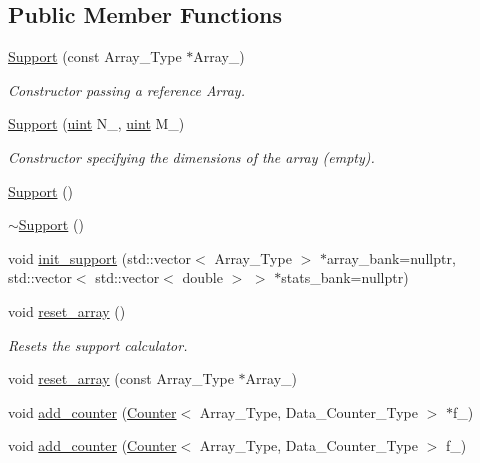\subsection*{Public Member Functions}
\begin{DoxyCompactItemize}
\item 
\hyperlink{class_support_aacc2852ede9e8d1294b8f2ea5625d525}{Support} (const Array\+\_\+\+Type $\ast$Array\+\_\+)
\begin{DoxyCompactList}\small\item\em Constructor passing a reference Array. \end{DoxyCompactList}\item 
\hyperlink{class_support_a1f6a7ae36567effe999602df879321cd}{Support} (\hyperlink{typedefs_8hpp_a91ad9478d81a7aaf2593e8d9c3d06a14}{uint} N\+\_\+, \hyperlink{typedefs_8hpp_a91ad9478d81a7aaf2593e8d9c3d06a14}{uint} M\+\_\+)
\begin{DoxyCompactList}\small\item\em Constructor specifying the dimensions of the array (empty). \end{DoxyCompactList}\item 
\hyperlink{class_support_a489bf1d96a2ae1e8494eb94d8d366e3f}{Support} ()
\item 
\hyperlink{class_support_a9c5f33ac43d962272b616948dec5d825}{$\sim$\+Support} ()
\item 
void \hyperlink{class_support_a013872a55ffd6a0a931e124da8e8dc99}{init\+\_\+support} (std\+::vector$<$ Array\+\_\+\+Type $>$ $\ast$array\+\_\+bank=nullptr, std\+::vector$<$ std\+::vector$<$ double $>$ $>$ $\ast$stats\+\_\+bank=nullptr)
\item 
void \hyperlink{class_support_a4f2860fd2e8e30703b91633a92ed7a58}{reset\+\_\+array} ()
\begin{DoxyCompactList}\small\item\em Resets the support calculator. \end{DoxyCompactList}\item 
void \hyperlink{class_support_a6e39b22dfd1e0a0ceebf596c974f5326}{reset\+\_\+array} (const Array\+\_\+\+Type $\ast$Array\+\_\+)
\item 
void \hyperlink{class_support_a364df2c6295341f2801ebe0419d1d97c}{add\+\_\+counter} (\hyperlink{class_counter}{Counter}$<$ Array\+\_\+\+Type, Data\+\_\+\+Counter\+\_\+\+Type $>$ $\ast$f\+\_\+)
\item 
void \hyperlink{class_support_a00d511970c0bf833ef8bdd7580c670cc}{add\+\_\+counter} (\hyperlink{class_counter}{Counter}$<$ Array\+\_\+\+Type, Data\+\_\+\+Counter\+\_\+\+Type $>$ f\+\_\+)

\end{DoxyCompactItemize}
